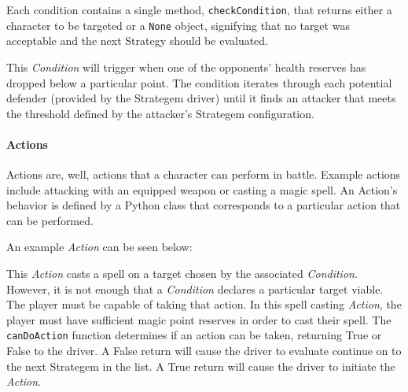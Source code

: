 \documentclass[11pt]{article}
\begin{document}
Each condition contains a single method, \texttt{checkCondition}, that returns either a character to be targeted or a \texttt{None} object, signifying that no target was acceptable and the next Strategy should be evaluated.

This \emph{Condition} will trigger when one of the opponents' health reserves has dropped below a particular point.  The condition iterates through each potential defender (provided by the Strategem driver) until it finds an attacker that meets the threshold defined by the attacker's Strategem configuration.

\paragraph{Actions} \hfill %

Actions are, well, actions that a character can perform in battle.  Example actions include attacking with an equipped weapon or casting a magic spell.  An Action's behavior is defined by a Python class that corresponds to a particular action that can be performed.

An example \emph{Action} can be seen below:

\singlespacing
{}
\doublespacing

This \emph{Action} casts a spell on a target chosen by the associated \emph{Condition}.  However, it is not enough that a \emph{Condition} declares a particular target viable.  The player must be capable of taking that action. In this spell casting \emph{Action}, the player must have sufficient magic point reserves in order to cast their spell.  The \texttt{canDoAction} function determines if an action can be taken, returning True or False to the driver.  A False return will cause the driver to evaluate continue on to the next Strategem in the list.  A True return will cause the driver to initiate the \emph{Action}.
\end{document}
